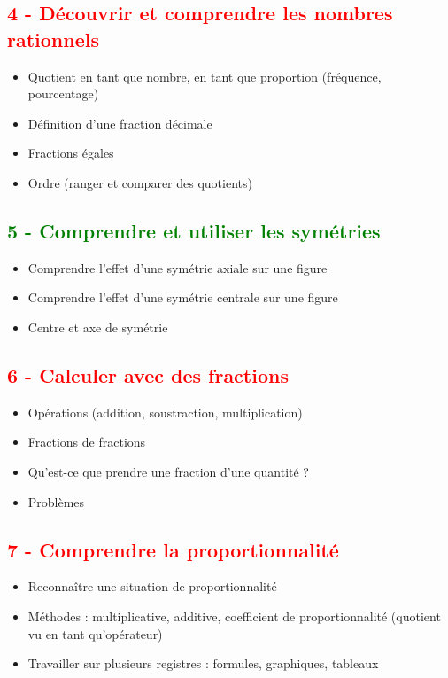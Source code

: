 \documentclass[12pt]{article}
\begin{document}
\begin{multicols}{2}
\subsection*{\textcolor{red}{4 - Découvrir et comprendre les nombres rationnels}}

\begin{itemize}
\item Quotient en tant que nombre, en tant que proportion (fréquence, pourcentage)
\item Définition d'une fraction décimale
\item Fractions égales
\item Ordre (ranger et comparer des quotients)
\end{itemize}

\subsection*{\textcolor{green}{5 - Comprendre et utiliser les symétries}}

\begin{itemize}
\item Comprendre l’effet d'une symétrie axiale sur une figure
\item Comprendre l'effet d'une symétrie centrale sur une figure
\item Centre et axe de symétrie
\end{itemize}

\subsection*{\textcolor{red}{6 - Calculer avec des fractions}}

\begin{itemize}

\item Opérations (addition, soustraction, multiplication)
\item Fractions de fractions
\item Qu'est-ce que prendre une fraction d'une quantité ?
\item Problèmes
\end{itemize}

\subsection*{\textcolor{red}{7 - Comprendre la proportionnalité}}

\begin{itemize}
\item Reconnaître une situation de proportionnalité
\item Méthodes : multiplicative, additive, coefficient de proportionnalité (quotient vu en tant qu’opérateur)
\item Travailler sur plusieurs registres : formules, graphiques, tableaux
\end{itemize}

\end{multicols}
\end{document}
